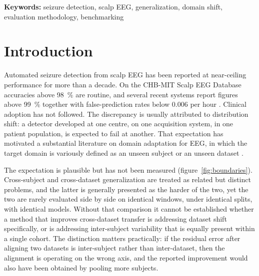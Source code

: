 \documentclass[11pt,a4paper]{article}
\begin{document}
\begin{abstract}
architectures was 0.66 times the spread from initialisation alone in the
cross-patient setting and 1.09 times it cross-cohort, and which architecture
ranked best cross-cohort changed with the seed. Scored at the event level on continuous recording, the learned
representations detected \SI{22}{\percent} of cross-cohort seizures at one
false alarm per hour and \SI{50}{\percent} at two, against \SI{1}{\percent}
and \SI{17}{\percent} for the handcrafted features.
\textbf{Significance.} Under this protocol, cross-cohort transfer appears to
depend more on the choice of representation than on the choice of
architecture, and more on inter-patient variability than on the additional
cohort shift observed between these two cohorts. A substantial part of the spread
in published performance figures is attributable to evaluation protocol.
\end{abstract}

\vspace{-0.2cm}
\noindent\small\textbf{Keywords:} seizure detection, scalp EEG,
generalization, domain shift, evaluation methodology, benchmarking
\normalsize

\vspace{0.3cm}

\section{Introduction}

Automated seizure detection from scalp EEG has been reported at near-ceiling
performance for more than a decade. On the CHB-MIT Scalp EEG Database
\citep{shoeb2009} accuracies above \SI{98}{\percent} are routine, and several
recent systems report figures above \SI{99}{\percent} together with
false-prediction rates below 0.006 per hour \citep{hybridconv2025}. Clinical
adoption has not followed. The discrepancy is usually attributed to
distribution shift: a detector developed at one centre, on one acquisition
system, in one patient population, is expected to fail at another. That
expectation has motivated a substantial literature on domain adaptation for
EEG, in which the target domain is variously defined as an unseen subject or
an unseen dataset \citep{jemal2024}.

The expectation is plausible but has not been measured
(figure~\ref{fig:boundaries}). Cross-subject and cross-dataset
generalization are treated as related but distinct problems,
and the latter is generally presented as the harder of the two, yet the two
are rarely evaluated side by side on identical windows, under identical
splits, with identical models. Without that comparison it cannot be
established whether a method that improves cross-dataset transfer is
addressing dataset shift specifically, or is addressing inter-subject
variability that is equally present within a single cohort. The distinction
matters practically: if the residual error after aligning two datasets is
inter-subject rather than inter-dataset, then the alignment is operating on
the wrong axis, and the reported improvement would also have been obtained by
pooling more subjects.
\end{document}
